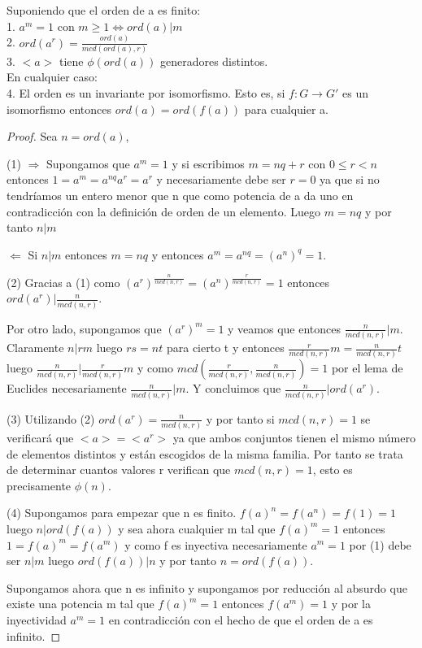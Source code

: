 \begin{proposition}
Suponiendo que el orden de a es finito: \\
1. $a^m = 1$ con $m \ge 1 \iff ord(a) | m$ \\
2. $ord(a^r) = \frac{ord(a)}{mcd(ord(a),r)}$ \\
3. $<a>$ tiene $\phi(ord(a))$ generadores distintos. \\
En cualquier caso: \\
4. El orden es un invariante por isomorfismo. Esto es, si $f:G \rightarrow G'$ es un isomorfismo entonces $ord(a) = ord(f(a))$ para cualquier a.
\end{proposition}
\begin{proof}
Sea $n = ord(a)$,

(1) $\Rightarrow$ Supongamos que $a^m = 1$ y si escribimos $m = nq + r$ con $0 \le r < n$ entonces $1=a^m = a^{nq}a^r = a^r$ y necesariamente debe ser $r = 0$ ya que si no tendríamos un entero menor que n que como potencia de a da uno en contradicción con la definición de orden de un elemento. Luego $m = nq$ y por tanto $n | m$

$\Leftarrow$ Si $n|m$ entonces $m = nq$ y entonces $a^m = a^{nq} = (a^n)^q = 1$.

(2) Gracias a (1) como $(a^r)^{\frac{n}{mcd(n,r)}} = (a^n)^{\frac{r}{mcd(n,r)}} = 1$ entonces $ord(a^r) | \frac{n}{mcd(n,r)}$. 

Por otro lado, supongamos que $(a^r)^m = 1$ y veamos que entonces $\frac{n}{mcd(n,r)} | m$. Claramente $n | rm$ luego $rs = nt$ para cierto t y entonces $\frac{r}{mcd(n,r)}m = \frac{n}{mcd(n,r)}t$ luego $\frac{n}{mcd(n,r)} | \frac{r}{mcd(n,r)}m$ y como $mcd\left(\frac{r}{mcd(n,r)},\frac{n}{mcd(n,r)}\right) = 1$ por el lema de Euclides necesariamente $\frac{n}{mcd(n,r)} | m$. Y concluimos que $\frac{n}{mcd(n,r)} | ord(a^r)$.

(3) Utilizando (2) $ord(a^r) = \frac{n}{mcd(n,r)}$ y por tanto si $mcd(n,r) = 1$  se verificará que $<a> = <a^r>$ ya que ambos conjuntos tienen el mismo número de elementos distintos y están escogidos de la misma familia. Por tanto se trata de determinar cuantos valores r verifican que $mcd(n,r) = 1$, esto es precisamente $\phi(n)$.

(4) Supongamos para empezar que n es finito. $f(a)^n=f(a^n)=f(1)=1$ luego $n |ord(f(a))$ y sea ahora cualquier m tal que $f(a)^m = 1$ entonces $1 = f(a)^m = f(a^m)$ y como f es inyectiva necesariamente $a^m = 1$ por (1) debe ser $n | m$ luego $ord(f(a)) | n$ y por tanto $n = ord(f(a))$.

Supongamos ahora que n es infinito y supongamos por reducción al absurdo que existe una potencia m tal que $f(a)^m = 1$ entonces $f(a^m) = 1$ y por la inyectividad $a^m = 1$ en contradicción con el hecho de que el orden de a es infinito.
\end{proof}

